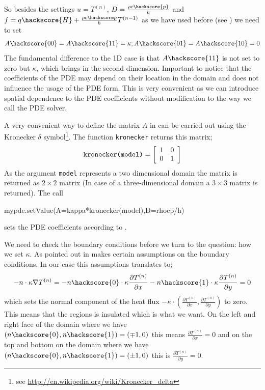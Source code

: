 So besides the settings $u=T^{(n)}$, $D = \frac{\rho c \hackscore{p}}{h}$ and
$f = q \hackscore{H} + \frac{\rho c\hackscore p}{h} T^{(n-1)}$ as we have used before (see ) we need to set
\begin{equation}\label{eqn: kappa general}
A\hackscore{00}=A\hackscore{11}=\kappa; A\hackscore{01}=A\hackscore{10}=0
\end{equation}
The fundamental difference to the 1D case is that $A\hackscore{11}$ is not set to zero but $\kappa$,
which brings in the second dimension. Important to notice that the coefficients 
of the PDE may depend on their location in the domain and does not influence the usage of the PDE form. This is very convenient as we can introduce spatial dependence to the PDE coefficients without modification to the way we call the PDE solver. 

A very convenient way to define the matrix $A$ in  can be carried out using the 
Kronecker $\delta$ symbol\footnote{see \url{http://en.wikipedia.org/wiki/Kronecker_delta}}. The 
\esc function \verb|kronecker| returns this matrix;
\begin{equation}
\verb|kronecker(model)| = \left[ 
\begin{array}{cc}
 1 & 0 \\
 0 & 1 \\
\end{array}
\right]
\end{equation}
As the argument \verb|model| represents a two dimensional domain the matrix is returned as $2 \times 2$ matrix
(In case of a three-dimensional domain a $3 \times 3$ matrix is returned). The call 
\begin{python}
mypde.setValue(A=kappa*kronecker(model),D=rhocp/h)
\end{python}
sets the PDE coefficients according to .  

We need to check the boundary conditions before we turn to the question: how we set $\kappa$. As
pointed out in  makes certain assumptions on the boundary conditions. In our case
this assumptions translates to;
\begin{equation}
-n \cdot \kappa \nabla T^{(n)} = 
-n\hackscore{0} \cdot \kappa \frac{\partial T^{(n)}}{\partial x} - n\hackscore{1} \cdot  \kappa \frac{\partial T^{(n)}}{\partial y} = 0
\label{eq:hom flux}
\end{equation}
which sets the normal component of the heat flux $- \kappa \cdot (\frac{\partial T^{(n)}}{\partial x}, \frac{\partial T^{(n)}}{\partial y})$ to zero. This means that the regions is insulated which is what we want. 
On the left and right face of the domain where we have $(n\hackscore{0},n\hackscore{1} ) = (\mp 1,0)$ 
this means $\frac{\partial T^{(n)}}{\partial x}=0$ and on the top and bottom on the domain 
where we have  $(n\hackscore{0},n\hackscore{1} ) = (\pm 1,0)$ this is $\frac{\partial T^{(n)}}{\partial y}=0$. 

